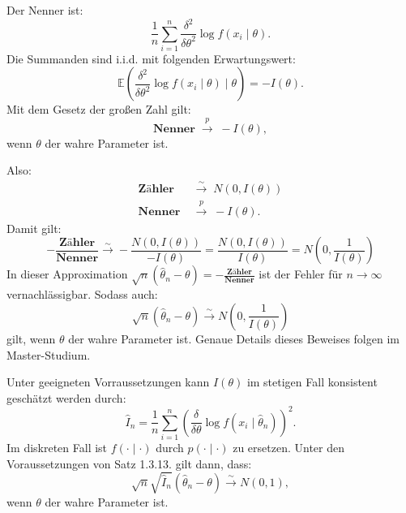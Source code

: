 \documentclass[10pt]{article}
\newcommand{\EW}{\mathbb{E}} %
\newcommand{\KW}{\overset{p} \longrightarrow} %
\newcommand{\KV}{\overset{\sim} \longrightarrow} %
\newcommand{\ablt}{\frac{\delta}{\delta \theta}}
\newenvironment{BWS}[1][]
{\begin{Beweis}[frametitle=#1]}{\end{Beweis}}
\begin{document}
\begin{BWS}[Beweisidee Verteilung des Schätzfehlers]
		Der Nenner ist:
		\begin{equation*}
			\frac{1}{n} \sum_{i=1}^{n} \frac{\delta^2}{\delta \theta^2} \log f(x_i \mid \theta).
		\end{equation*}
		Die Summanden sind i.i.d. mit folgenden Erwartungswert:
		\begin{equation*}
			\EW \left(\frac{\delta^2}{\delta \theta^2} \log f(x_i \mid \theta) \mid \theta \right) = -I(\theta).
		\end{equation*}
		Mit dem Gesetz der großen Zahl gilt:
		\begin{equation*}
			\textbf{Nenner} \; \KW \; -I(\theta),
		\end{equation*}
		wenn $\theta$ der wahre Parameter ist. 
		
		Also: 
		\begin{equation*}
			\begin{split}
				\textbf{Zähler} \; &\KV \; N(0,I(\theta))\\
				\textbf{Nenner} \; &\KW \; -I(\theta).
			\end{split}
		\end{equation*}
		Damit gilt:
		\begin{equation*}
			- \frac{\textbf{Zähler}}{\textbf{Nenner}} \KV -\frac{N(0,I(\theta))}{-I(\theta)} = \frac{N(0, I(\theta))}{I(\theta)} = N\left(0, \frac{1}{I(\theta)}\right)
		\end{equation*}
		In dieser Approximation $\sqrt{n}(\hat{\theta}_n - \theta) = - \frac{\textbf{Zähler}}{\textbf{Nenner}}$ ist der Fehler für $n \rightarrow \infty$ vernachlässigbar. Sodass auch:
		\begin{equation*}
			\sqrt{n}(\hat{\theta}_n - \theta)  \KV N\left(0, \frac{1}{I(\theta)}\right)
		\end{equation*}
		gilt, wenn $\theta$ der wahre Parameter ist. Genaue Details dieses Beweises folgen im Master-Studium. 
	\end{BWS}
	Unter geeigneten Vorraussetzungen kann $I(\theta)$ im stetigen Fall konsistent geschätzt werden durch:
	\begin{equation*}
		\hat{I}_n = \frac{1}{n} \sum_{i=1}^{n}\left(\ablt \log f(x_i\mid \hat{\theta}_n)\right)^2.
	\end{equation*}
	Im diskreten Fall ist $f(\cdot \mid \cdot)$ durch $p(\cdot \mid \cdot)$ zu ersetzen.
	Unter den Voraussetzungen von Satz 1.3.13. gilt dann, dass:
	\begin{equation*}
		\sqrt{n} \sqrt{\hat{I}_n}(\hat{\theta}_n - \theta) \KV N(0,1),
	\end{equation*}
	wenn $\theta$ der wahre Parameter ist. 
	
\end{document}
